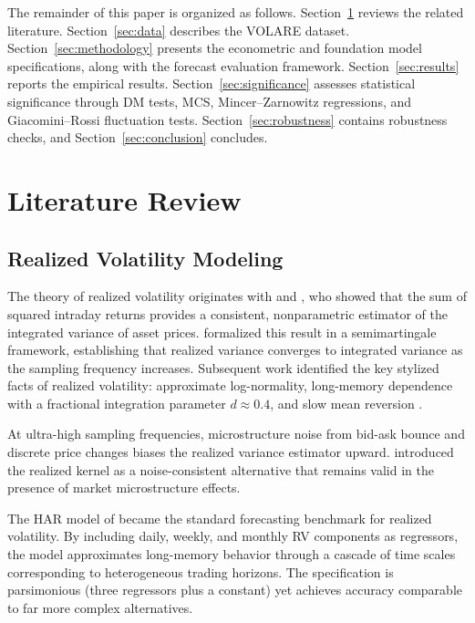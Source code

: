 \documentclass[12pt]{article}
\begin{document}
The remainder of this paper is organized as follows. Section~\ref{sec:literature} reviews the related literature. Section~\ref{sec:data} describes the VOLARE dataset. Section~\ref{sec:methodology} presents the econometric and foundation model specifications, along with the forecast evaluation framework. Section~\ref{sec:results} reports the empirical results. Section~\ref{sec:significance} assesses statistical significance through DM tests, MCS, Mincer--Zarnowitz regressions, and Giacomini--Rossi fluctuation tests. Section~\ref{sec:robustness} contains robustness checks, and Section~\ref{sec:conclusion} concludes.

\section{Literature Review}
\label{sec:literature}

\subsection{Realized Volatility Modeling}
\label{subsec:rv_modeling}

The theory of realized volatility originates with \citet{andersen1998} and \citet{andersen2001exchange}, who showed that the sum of squared intraday returns provides a consistent, nonparametric estimator of the integrated variance of asset prices. \citet{barndorffnielsen2002} formalized this result in a semimartingale framework, establishing that realized variance converges to integrated variance as the sampling frequency increases. Subsequent work identified the key stylized facts of realized volatility: approximate log-normality, long-memory dependence with a fractional integration parameter $d \approx 0.4$, and slow mean reversion \citep{andersen2003}.

At ultra-high sampling frequencies, microstructure noise from bid-ask bounce and discrete price changes biases the realized variance estimator upward. \citet{barndorffnielsen2008} introduced the realized kernel as a noise-consistent alternative that remains valid in the presence of market microstructure effects.

The HAR model of \citet{corsi2009} became the standard forecasting benchmark for realized volatility. By including daily, weekly, and monthly RV components as regressors, the model approximates long-memory behavior through a cascade of time scales corresponding to heterogeneous trading horizons. The specification is parsimonious (three regressors plus a constant) yet achieves accuracy comparable to far more complex alternatives.
\end{document}
